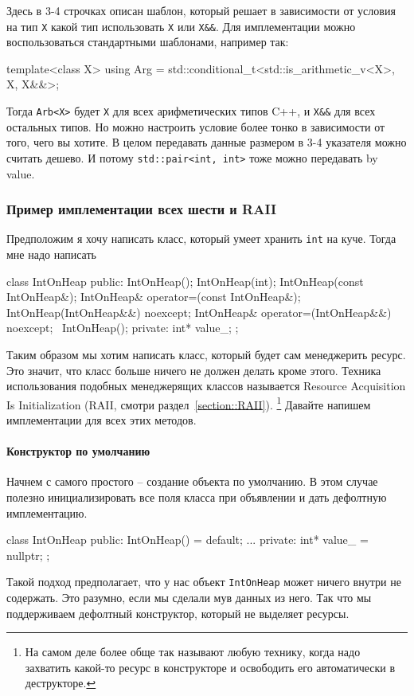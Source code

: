 Здесь в 3-4 строчках описан шаблон, который решает в зависимости от условия на тип \verb"X" какой тип использовать \verb"X" или \verb"X&&".
Для имплементации можно воспользоваться стандартными шаблонами, например так:
\begin{cppcode}
template<class X>
using Arg = std::conditional_t<std::is_arithmetic_v<X>, X, X&&>;
\end{cppcode}
Тогда \verb"Arb<X>" будет \verb"X" для всех арифметических типов C++, и \verb"X&&" для всех остальных типов.
Но можно настроить условие более тонко в зависимости от того, чего вы хотите.
В целом передавать данные размером в 3-4 указателя можно считать дешево.
И потому \verb"std::pair<int, int>" тоже можно передавать by value.

\subsubsection{Пример имплементации всех шести и RAII}
\label{section::siximpl}

Предположим я хочу написать класс, который умеет хранить \verb"int" на куче.
Тогда мне надо написать
\begin{cppcode}
class IntOnHeap {
public:
  IntOnHeap();
  IntOnHeap(int);
  IntOnHeap(const IntOnHeap&);
  IntOnHeap& operator=(const IntOnHeap&);
  IntOnHeap(IntOnHeap&&) noexcept;
  IntOnHeap& operator=(IntOnHeap&&) noexcept;
  ~IntOnHeap();
private:
  int* value_;
};
\end{cppcode}
Таким образом мы хотим написать класс, который будет сам менеджерить ресурс.
Это значит, что класс больше ничего не должен делать кроме этого.
Техника использования подобных менеджерящих классов называется Resource Acquisition Is Initialization (RAII, смотри раздел~\ref{section::RAII}).%
\footnote{На самом деле более обще так называют любую технику, когда надо захватить какой-то ресурс в конструкторе и освободить его автоматически в деструкторе.}
Давайте напишем имплементации для всех этих методов.

\paragraph{Конструктор по умолчанию}

Начнем с самого простого -- создание объекта по умолчанию.
В этом случае полезно инициализировать все поля класса при объявлении и дать дефолтную имплементацию.
\begin{cppcode}
class IntOnHeap {
public:
  IntOnHeap() = default;
  ...
private:
  int* value_ = nullptr;
};
\end{cppcode}
Такой подход предполагает, что у нас объект \verb"IntOnHeap" может ничего внутри не содержать.
Это разумно, если мы сделали мув данных из него.
Так что мы поддерживаем дефолтный конструктор, который не выделяет ресурсы.

